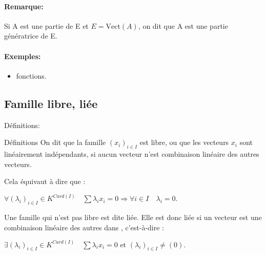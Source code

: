 \documentclass{book}
\begin{document}
\paragraph{Remarque:}

Si A est une partie de E et ${\displaystyle E=\mathrm {Vect} \left(A\right)}$, on dit que A est une partie génératrice de E.

\paragraph{Exemples: }
\begin{itemize}
    \item fonctions.
\end{itemize}
\subsection{Famille libre, liée}
Définitions:
\begin{Définition}[]{Définitions}{}
On dit que la famille ${\displaystyle (x_{i})_{i\in I}}$ est libre, ou que les vecteurs ${\displaystyle x_{i}}$ sont linéairement indépendants, si aucun vecteur n'est combinaison linéaire des autres vecteurs.

Cela équivaut à dire que :
\begin{framed}
${\displaystyle \forall (\lambda _{i})_{i\in I}\in K^{Card(I)}\quad \sum \lambda _{i}x_{i}=0\Rightarrow \forall i\in I\quad \lambda _{i}=0}.$
\end{framed}

Une famille qui n'est pas libre est dite liée. Elle est donc liée si un vecteur est une combinaison linéaire des autres dans , c'est-à-dire :
\begin{framed}
${\displaystyle \exists (\lambda _{i})_{i\in I}\in K^{Card(I)}\quad \sum \lambda _{i}x_{i}=0{\text{ et }}(\lambda _{i})_{i\in I}\neq (0)}.$
\end{framed}
\end{Définition}
\end{document}
